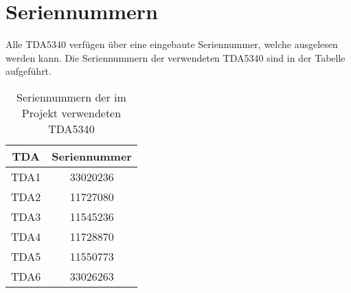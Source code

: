 \section{Seriennummern}
\label{app:Seriennummern}
Alle TDA5340 verfügen über eine eingebaute Seriennummer, welche ausgelesen werden kann. Die Seriennummern der verwendeten TDA5340 sind in der Tabelle aufgeführt.
\begin{table}[h]
	\centering
	\begin{tabular}{cc}
		TDA & Seriennummer\\
		\hline
		TDA1 & 33020236\\
		TDA2 & 11727080\\
		TDA3& 11545236\\
		TDA4& 11728870\\
		TDA5& 11550773\\
		TDA6& 33026263\\
	\end{tabular}
	\caption{Seriennummern der im Projekt verwendeten TDA5340 }
	\label{default}
\end{table}
